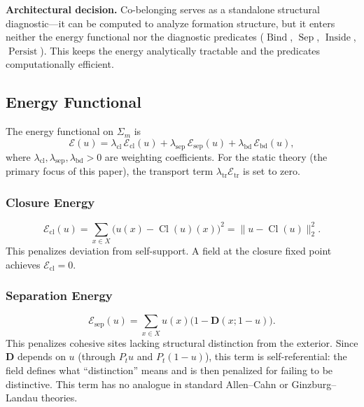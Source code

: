 \documentclass[lettersize,journal]{IEEEtran}
\DeclareMathOperator{\Cl}{Cl}
\DeclareMathOperator{\Bind}{Bind}
\DeclareMathOperator{\Sep}{Sep}
\DeclareMathOperator{\Inside}{Inside}
\DeclareMathOperator{\Persist}{Persist}
\begin{document}
\textbf{Architectural decision.} Co-belonging serves as a standalone structural diagnostic---it can be computed to analyze formation structure, but it enters neither the energy functional nor the diagnostic predicates ($\Bind$, $\Sep$, $\Inside$, $\Persist$). This keeps the energy analytically tractable and the predicates computationally efficient.

\subsection{Energy Functional}
\label{sec:energy}

The energy functional on $\Sigma_m$ is
\begin{equation}
\label{eq:energy}
\mathcal{E}(u) = \lambda_{\mathrm{cl}}\,\mathcal{E}_{\mathrm{cl}}(u) + \lambda_{\mathrm{sep}}\,\mathcal{E}_{\mathrm{sep}}(u) + \lambda_{\mathrm{bd}}\,\mathcal{E}_{\mathrm{bd}}(u),
\end{equation}
where $\lambda_{\mathrm{cl}}, \lambda_{\mathrm{sep}}, \lambda_{\mathrm{bd}} > 0$ are weighting coefficients. For the static theory (the primary focus of this paper), the transport term $\lambda_{\mathrm{tr}}\mathcal{E}_{\mathrm{tr}}$ is set to zero.

\subsubsection{Closure Energy}
\begin{equation}
\label{eq:E_cl}
\mathcal{E}_{\mathrm{cl}}(u) = \sum_{x \in X} \bigl(u(x) - \Cl(u)(x)\bigr)^2 = \|u - \Cl(u)\|_2^2.
\end{equation}
This penalizes deviation from self-support. A field at the closure fixed point achieves $\mathcal{E}_{\mathrm{cl}} = 0$.

\subsubsection{Separation Energy}
\begin{equation}
\label{eq:E_sep}
\mathcal{E}_{\mathrm{sep}}(u) = \sum_{x \in X} u(x)\bigl(1 - \mathbf{D}(x; 1-u)\bigr).
\end{equation}
This penalizes cohesive sites lacking structural distinction from the exterior. Since $\mathbf{D}$ depends on $u$ (through $P_t u$ and $P_t(1-u)$), this term is self-referential: the field defines what ``distinction'' means and is then penalized for failing to be distinctive. This term has no analogue in standard Allen--Cahn or Ginzburg--Landau theories.
\end{document}
